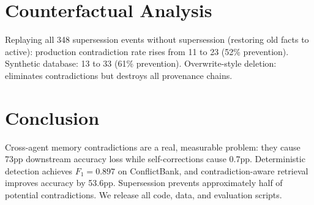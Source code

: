 \documentclass{article}
\begin{document}
\section{Counterfactual Analysis}Replaying all 348 supersession events without supersession (restoring old facts to active): production contradiction rate rises from 11 to 23 (52\% prevention). Synthetic database: 13 to 33 (61\% prevention). Overwrite-style deletion: eliminates contradictions but destroys all provenance chains.
\section{Conclusion}Cross-agent memory contradictions are a real, measurable problem: they cause 73pp downstream accuracy loss while self-corrections cause 0.7pp. Deterministic detection achieves $F_1{=}0.897$ on ConflictBank, and contradiction-aware retrieval improves accuracy by 53.6pp. Supersession prevents approximately half of potential contradictions. We release all code, data, and evaluation scripts.
\end{document}
